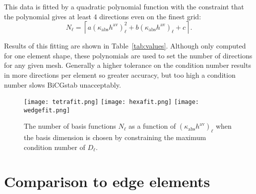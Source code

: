 \documentclass[a4paper,12pt]{article}
\begin{document}
This data is fitted by a quadratic polynomial function with the constraint that the polynomial gives at least 4 directions even on the finest grid:
\begin{equation}
\label{eq:Nell}
N_{\ell} = \left \lceil{a\left(\kappa_{\mathrm{abs}}h^{\mathrm{av}}\right)_{\ell}^2 + b\left(\kappa_{\mathrm{abs}}h^{\mathrm{av}}\right)_{\ell} + c}\right \rceil.
\end{equation}

Results of this fitting are shown in Table~\ref{tab:values}. Although only computed for one element shape, these polynomials are used to set the number of directions for any given mesh.  Generally a higher tolerance on the condition number results in more directions per element so greater accuracy, but too high a condition number slows BiCGstab unacceptably.
\begin{figure}[!htb]
    \centering
    \texttt{[image: tetrafit.png]} 
    \texttt{[image: hexafit.png]} 
    \texttt{[image: wedgefit.png]} 
\caption{The number of basis functions $N_{\ell}$ as a function of $(\kappa_{\mathrm{abs}}h^{\mathrm{av}})_{\ell}$ when the basis dimension is chosen by constraining the maximum
condition number of $D_{\ell}$.}
    \label{fig:pw_selection}
\end{figure}

\begin{table}[!htb]
    \caption{Parameters for the basis polynomials (see (\ref{eq:Nell})).}
    \centering
    \label{tab:values}
\end{table}

\section{Comparison to edge elements}\label{sec:app_comp}
\end{document}
